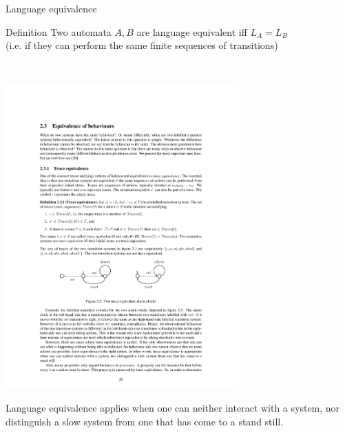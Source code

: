 \documentclass[aspectratio=169]{beamer}
\begin{document}
\begin{slide}{Language  equivalence}
\small

\begin{block}{Definition}
Two automata $A, B$ are \alert{language equivalent} iff  $ L_A =  L_B$\\
(i.e. if they can perform the same finite sequences of transitions)
\end{block}
~\\

\begin{example}
  \centering
  \includegraphics[width=9cm]{./images/alarm3.pdf}
\end{example}


\alert{Language equivalence} applies  when one can neither interact with a system, nor distinguish a slow system from one that has come to a stand still.
\end{slide}


\end{document}

